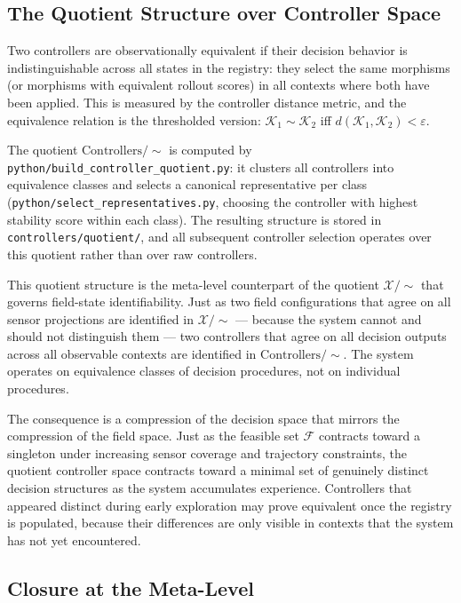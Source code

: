 \documentclass[12pt, oneside]{article}
\newcommand{\Xmod}{\mathcal{X}/{\sim}}
\begin{document}
\subsection{The Quotient Structure over Controller Space}

Two controllers are observationally equivalent if their decision behavior is
indistinguishable across all states in the registry: they select the same morphisms
(or morphisms with equivalent rollout scores) in all contexts where both have been
applied. This is measured by the controller distance metric, and the equivalence
relation is the thresholded version: $\mathcal{K}_1 \sim \mathcal{K}_2$ iff
$d(\mathcal{K}_1, \mathcal{K}_2) < \varepsilon$.

The quotient $\mathrm{Controllers}/{\sim}$ is computed by
\texttt{python/build\_controller\_quotient.py}: it clusters all controllers into
equivalence classes and selects a canonical representative per class
(\texttt{python/select\_representatives.py}, choosing the controller with highest
stability score within each class). The resulting structure is stored in
\texttt{controllers/quotient/}, and all subsequent controller selection operates over
this quotient rather than over raw controllers.

This quotient structure is the meta-level counterpart of the quotient $\Xmod$ that
governs field-state identifiability. Just as two field configurations that agree on all
sensor projections are identified in $\Xmod$ --- because the system cannot and should not
distinguish them --- two controllers that agree on all decision outputs across all
observable contexts are identified in $\mathrm{Controllers}/{\sim}$. The system operates
on equivalence classes of decision procedures, not on individual procedures.

The consequence is a compression of the decision space that mirrors the compression of
the field space. Just as the feasible set $\mathcal{F}$ contracts toward a singleton
under increasing sensor coverage and trajectory constraints, the quotient controller
space contracts toward a minimal set of genuinely distinct decision structures as the
system accumulates experience. Controllers that appeared distinct during early exploration
may prove equivalent once the registry is populated, because their differences are only
visible in contexts that the system has not yet encountered.

\subsection{Closure at the Meta-Level}
\end{document}
